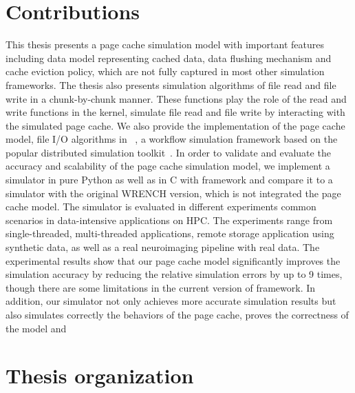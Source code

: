 \section{Contributions}

This thesis presents a page cache simulation model with important features 
including data model representing cached data, data flushing mechanism and 
cache eviction policy, which are not fully captured in most  other 
simulation frameworks. 
The thesis also presents simulation algorithms of file read and file write in a chunk-by-chunk manner. 
These functions play the role of the read and write functions in the kernel, 
simulate file read and file write by interacting with the simulated page cache.
We also provide the implementation of the page cache model, 
file I/O algorithms in \wrench~\cite{casanova2020fgcs}, 
a workflow simulation framework based on the popular 
\simgrid distributed simulation toolkit~\cite{casanova2014simgrid}. 
In order to validate and evaluate the accuracy and scalability of the page cache 
simulation model, we implement a simulator in pure Python as well as 
in C with \wrench framework and compare it to a simulator with the original 
WRENCH version, which is not integrated the page cache model. 
The simulator is evaluated in different experiments common 
scenarios in data-intensive applications on HPC.
The experiments range from single-threaded, multi-threaded applications, 
remote storage application using synthetic data, as well as a real neuroimaging 
pipeline with real data.
The experimental results show that our page cache model significantly improves 
the simulation accuracy by reducing the relative simulation errors by up to 9 times, 
though there are some limitations in the current version of \simgrid framework. 
In addition, our simulator not only achieves more accurate simulation results 
but also simulates correctly the behaviors of the page cache, proves the correctness 
of the model and  

\section{Thesis organization}

